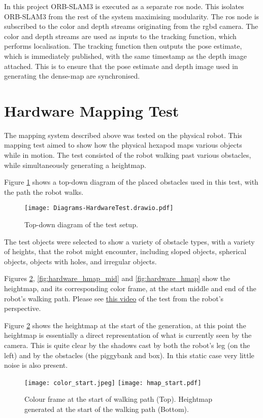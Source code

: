     In this project ORB-SLAM3 is executed as a separate \ac{ros} node. This isolates ORB-SLAM3 from the rest of the system maximising modularity. The \ac{ros} node is subscribed to the color and depth streams originating from the \ac{rgbd} camera. The color and depth streams are used as inputs to the tracking function, which performs localisation. The tracking function then outputs the pose estimate, which is immediately published, with the same timestamp as the depth image attached. This is to ensure that the pose estimate and depth image used in generating the dense-map are synchronised.

    \newpage
    \section{Hardware Mapping Test}\label{sec:hardware_hmap}
        The mapping system described above was tested on the physical robot. This mapping test aimed to show how the physical hexapod maps various objects while in motion. The test consisted of the robot walking past various obstacles, while simultaneously generating a heightmap.

        Figure \ref{fig:hardware_map_diag} shows a top-down diagram of the placed obstacles used in this test, with the path the robot walks.
        \begin{figure}[h]
            \centering
            \texttt{[image: Diagrams-HardwareTest.drawio.pdf]}
            \caption{Top-down diagram of the test setup.}
            \label{fig:hardware_map_diag}
        \end{figure}

        \noindent
        The test objects were selected to show a variety of obstacle types, with a variety of heights, that the robot might encounter, including sloped objects, spherical objects, objects with holes, and irregular objects.

        Figures \ref{fig:hardware_hmap_start}, \ref{fig:hardware_hmap_mid} and \ref{fig:hardware_hmap} show the heightmap, and its corresponding color frame, at the start middle and end of the
        robot's walking path. Please see \hyperlink{}{this video} of the test from the robot's perspective.
        
        \newpage
        \noindent
        Figure \ref{fig:hardware_hmap_start} shows the heightmap at the start of the generation, at this point the heightmap is essentially a direct representation of what is currently seen by the camera. This is quite clear by the shadows cast by both the robot's leg (on the left) and by the obstacles (the piggybank and box). In this static case
        very little noise is also present.
        \begin{figure}[h]
            \centering
            \hspace{-0.8cm}
            \texttt{[image: color\_start.jpeg]}
            \texttt{[image: hmap\_start.pdf]}
            \caption{Colour frame at the start of walking path (Top). Heightmap generated at the start of the walking path (Bottom).}
            \label{fig:hardware_hmap_start}
        \end{figure}
        
